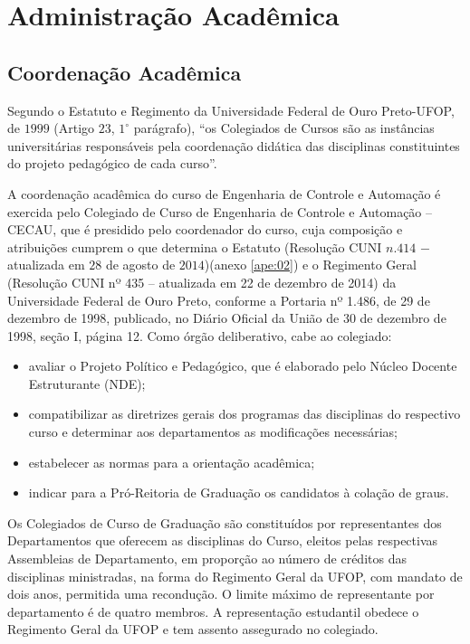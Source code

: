 \chapter{Administra{\c c}{\~a}o Acad{{\^e}mica}}
\label{cap:03} 

\section{Coordenação Acadêmica}
Segundo o Estatuto e Regimento da Universidade Federal de Ouro Preto-UFOP, de $1999$ (Artigo $23$, $ 1^{\circ}$  parágrafo), ``os Colegiados de Cursos são as instâncias universitárias responsáveis pela coordenação didática das disciplinas constituintes do projeto pedagógico de cada curso''.

A coordenação acadêmica do curso de Engenharia de Controle e Automação é exercida pelo Colegiado de Curso de Engenharia de Controle e Automação – CECAU, que é presidido pelo coordenador do curso, cuja composição e atribuições cumprem o que determina o Estatuto (Resolução CUNI $n. 414$ $-$ atualizada em $28$ de agosto de $2014$)(anexo \ref{ape:02}) e o Regimento Geral (Resolução CUNI nº 435 – atualizada em 22 de dezembro de 2014) da Universidade Federal de Ouro Preto, conforme a Portaria nº 1.486, de 29 de dezembro de 1998, publicado, no Diário Oficial da União de 30 de dezembro de 1998, seção I, página 12. Como órgão deliberativo, cabe ao colegiado:

\begin{itemize}
	\item avaliar o Projeto Político e Pedagógico, que é elaborado pelo Núcleo Docente Estruturante (NDE);
	\item compatibilizar as diretrizes gerais dos programas das disciplinas do respectivo curso e determinar aos departamentos as modificações necessárias;
	\item estabelecer as normas para a orientação acadêmica; 
	\item indicar para a Pró-Reitoria de Graduação os candidatos à colação de graus. 
\end{itemize}

Os Colegiados de Curso de Graduação são constituídos por representantes dos Departamentos que oferecem as disciplinas do Curso, eleitos pelas respectivas Assembleias de Departamento, em proporção ao número de créditos das disciplinas ministradas, na forma do Regimento Geral da UFOP, com mandato de dois anos, permitida uma recondução. O limite máximo de representante por departamento é de quatro membros. A representação estudantil obedece o Regimento Geral da UFOP e tem assento assegurado no colegiado.


